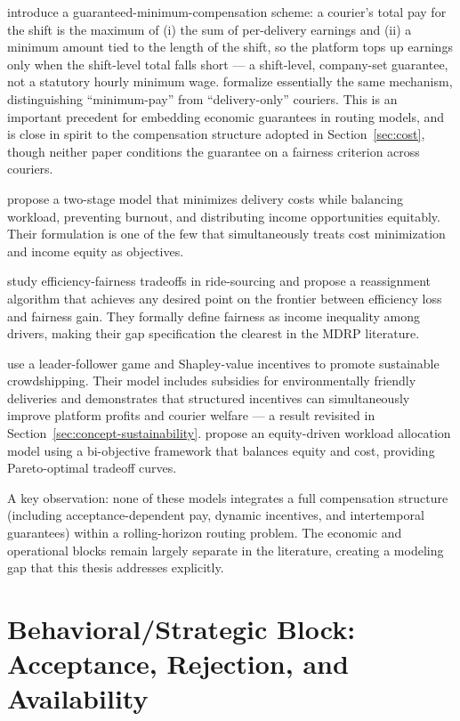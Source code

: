 \documentclass[12pt,a4paper]{report}
\begin{document}
\citet{reyes2018meal} introduce a guaranteed-minimum-compensation scheme: a courier's total pay for the shift is the maximum of (i) the sum of per-delivery earnings and (ii) a minimum amount tied to the length of the shift, so the platform tops up earnings only when the shift-level total falls short --- a shift-level, company-set guarantee, not a statutory hourly minimum wage. \citet{yildiz2019provably} formalize essentially the same mechanism, distinguishing ``minimum-pay'' from ``delivery-only'' couriers. This is an important precedent for embedding economic guarantees in routing models, and is close in spirit to the compensation structure adopted in Section~\ref{sec:cost}, though neither paper conditions the guarantee on a fairness criterion across couriers.

\citet{wen2010dynamic} propose a two-stage model that minimizes delivery costs while balancing workload, preventing burnout, and distributing income opportunities equitably. Their formulation is one of the few that simultaneously treats cost minimization and income equity as objectives.

\citet{lesmana2019balancing} study efficiency-fairness tradeoffs in ride-sourcing and propose a reassignment algorithm that achieves any desired point on the frontier between efficiency loss and fairness gain. They formally define fairness as income inequality among drivers, making their gap specification the clearest in the MDRP literature.

\citet{bajec2022strategic} use a leader-follower game and Shapley-value incentives to promote sustainable crowdshipping. Their model includes subsidies for environmentally friendly deliveries and demonstrates that structured incentives can simultaneously improve platform profits and courier welfare --- a result revisited in Section~\ref{sec:concept-sustainability}. \citet{sobhanan2024equity} propose an equity-driven workload allocation model using a bi-objective framework that balances equity and cost, providing Pareto-optimal tradeoff curves.

A key observation: none of these models integrates a full compensation structure (including acceptance-dependent pay, dynamic incentives, and intertemporal guarantees) within a rolling-horizon routing problem. The economic and operational blocks remain largely separate in the literature, creating a modeling gap that this thesis addresses explicitly.

\section{Behavioral/Strategic Block: Acceptance, Rejection, and Availability}
\label{sec:behavioural}
\end{document}
